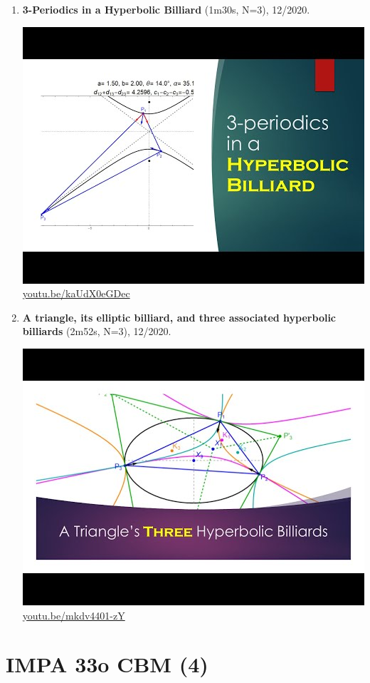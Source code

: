 \documentclass[12pt]{amsart}
\begin{document}
\begin{enumerate}[resume]
\item \textbf{3-Periodics in a Hyperbolic Billiard} (1m30s, N=3), 12/2020. 
\begin{center}\includegraphics[width=.5\textwidth]{pics/kaUdX0eGDec.jpg} \\ 
\href{https://youtu.be/kaUdX0eGDec}{\url{youtu.be/kaUdX0eGDec}}\end{center}
% 
\item \textbf{A triangle, its elliptic billiard, and three associated hyperbolic billiards} (2m52s, N=3), 12/2020. 
\begin{center}\includegraphics[width=.5\textwidth]{pics/mkdv4401-zY.jpg} \\ 
\href{https://youtu.be/mkdv4401-zY}{\url{youtu.be/mkdv4401-zY}}\end{center}
% 
\end{enumerate}

\section{IMPA 33o CBM (4)}
\end{document}
